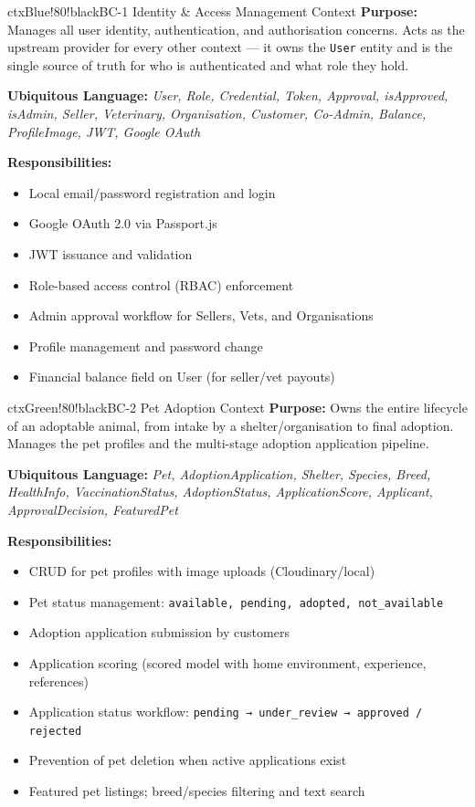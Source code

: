 \documentclass[12pt,a4paper]{article}
\begin{document}
\begin{contextbox}{ctxBlue!80!black}{BC-1 \quad Identity \& Access Management Context}
\textbf{Purpose:} Manages all user identity, authentication, and authorisation concerns. Acts as the upstream provider for every other context — it owns the \texttt{User} entity and is the single source of truth for who is authenticated and what role they hold.

\textbf{Ubiquitous Language:} \textit{User, Role, Credential, Token, Approval, isApproved, isAdmin, Seller, Veterinary, Organisation, Customer, Co-Admin, Balance, ProfileImage, JWT, Google OAuth}

\textbf{Responsibilities:}
\begin{itemize}
  \item Local email/password registration and login
  \item Google OAuth 2.0 via Passport.js
  \item JWT issuance and validation
  \item Role-based access control (RBAC) enforcement
  \item Admin approval workflow for Sellers, Vets, and Organisations
  \item Profile management and password change
  \item Financial balance field on User (for seller/vet payouts)
\end{itemize}
\end{contextbox}

\vspace{0.5em}

\begin{contextbox}{ctxGreen!80!black}{BC-2 \quad Pet Adoption Context}
\textbf{Purpose:} Owns the entire lifecycle of an adoptable animal, from intake by a shelter/organisation to final adoption. Manages the pet profiles and the multi-stage adoption application pipeline.

\textbf{Ubiquitous Language:} \textit{Pet, AdoptionApplication, Shelter, Species, Breed, HealthInfo, VaccinationStatus, AdoptionStatus, ApplicationScore, Applicant, ApprovalDecision, FeaturedPet}

\textbf{Responsibilities:}
\begin{itemize}
  \item CRUD for pet profiles with image uploads (Cloudinary/local)
  \item Pet status management: \texttt{available, pending, adopted, not\_available}
  \item Adoption application submission by customers
  \item Application scoring (scored model with home environment, experience, references)
  \item Application status workflow: \texttt{pending → under\_review → approved / rejected}
  \item Prevention of pet deletion when active applications exist
  \item Featured pet listings; breed/species filtering and text search
\end{itemize}
\end{contextbox}
\end{document}
